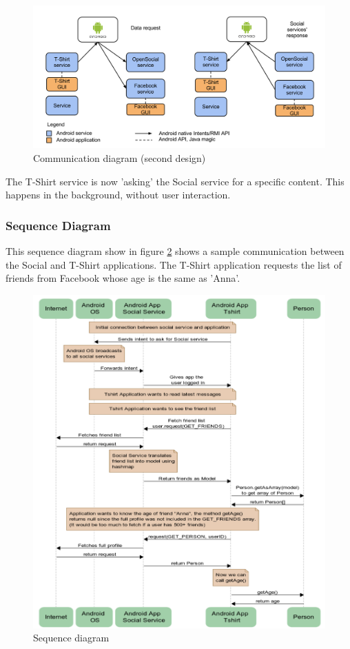 \begin{figure}[h!]
\centering \includegraphics[scale=0.35]{img/design-reqresp.png}
\caption{Communication diagram (second design)}
\label{fig:design-reqresp}
\end{figure}

The T-Shirt service is now 'asking' the Social service for a specific content.
This happens in the background, without user interaction.



\subsubsection{Sequence Diagram}
This sequence diagram show in figure \ref{fig:design-sequence} shows a sample communication between the Social and T-Shirt applications.
The T-Shirt application requests the list of friends from Facebook whose age is the same as 'Anna'.

\begin{figure}[h!]
\centering \includegraphics[width=1.0\textwidth]{img/design-sequence.png}
\caption{Sequence diagram}
\label{fig:design-sequence}
\end{figure}




